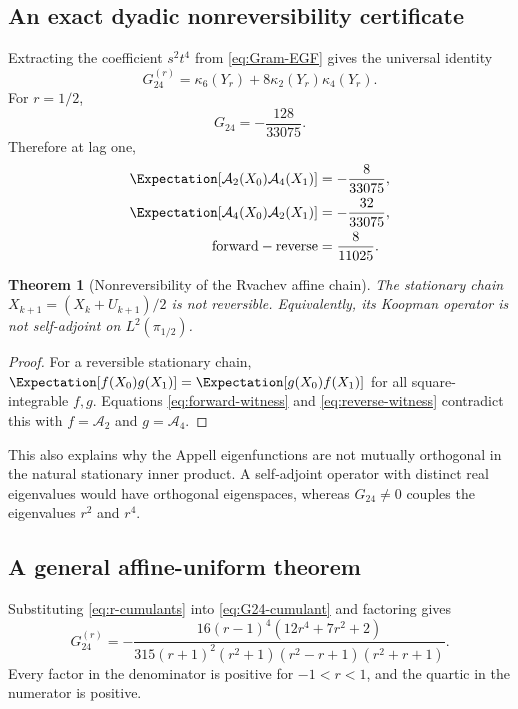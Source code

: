 \documentclass[11pt,a4paper]{article}
\newtheorem{theorem}{Theorem}[section]
\theoremstyle{definition}
\theoremstyle{remark}
\newcommand{\Acal}{\mathcal A}
\begin{document}
\subsection{An exact dyadic nonreversibility certificate}

Extracting the coefficient $s^2t^4$ from \eqref{eq:Gram-EGF} gives the universal identity
\begin{equation}
 G_{24}^{(r)}=\kappa_6(Y_r)+8\kappa_2(Y_r)\kappa_4(Y_r).
 \label{eq:G24-cumulant}
\end{equation}
For $r=1/2$,
\begin{equation}
 \boxed{\displaystyle
 G_{24}=-\frac{128}{33075}.}
 \label{eq:G24-dyadic}
\end{equation}
Therefore at lag one,
\begin{align}
 \Expectation[\Acal_2(X_0)\Acal_4(X_1)]
 &=-\frac8{33075},
 \label{eq:forward-witness}\\
 \Expectation[\Acal_4(X_0)\Acal_2(X_1)]
 &=-\frac{32}{33075},
 \label{eq:reverse-witness}\\
 \text{forward}-\text{reverse}
 &=\frac8{11025}.
 \label{eq:witness-difference}
\end{align}

\begin{theorem}[Nonreversibility of the Rvachev affine chain]
\label{thm:dyadic-nonreversible}
The stationary chain
\(
 X_{k+1}=(X_k+U_{k+1})/2
\)
is not reversible. Equivalently, its Koopman operator is not self-adjoint on $L^2(\pi_{1/2})$.
\end{theorem}

\begin{proof}
For a reversible stationary chain, $\Expectation[f(X_0)g(X_1)]=\Expectation[g(X_0)f(X_1)]$ for all square-integrable $f,g$. Equations \eqref{eq:forward-witness} and \eqref{eq:reverse-witness} contradict this with $f=\Acal_2$ and $g=\Acal_4$.
\end{proof}

This also explains why the Appell eigenfunctions are not mutually orthogonal in the natural stationary inner product. A self-adjoint operator with distinct real eigenvalues would have orthogonal eigenspaces, whereas $G_{24}\ne0$ couples the eigenvalues $r^2$ and $r^4$.

\subsection{A general affine-uniform theorem}

Substituting \eqref{eq:r-cumulants} into \eqref{eq:G24-cumulant} and factoring gives
\begin{equation}
 \boxed{\displaystyle
 G_{24}^{(r)}
 =-\frac{16(r-1)^4(12r^4+7r^2+2)}
 {315(r+1)^2(r^2+1)(r^2-r+1)(r^2+r+1)}.}
 \label{eq:G24-factor}
\end{equation}
Every factor in the denominator is positive for $-1<r<1$, and the quartic in the numerator is positive.
\end{document}
